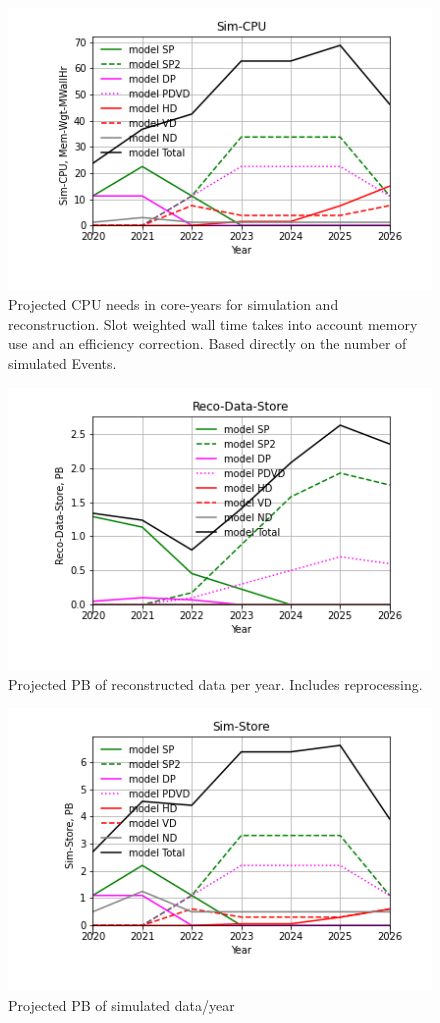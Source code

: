 \begin{figure}[h]
\centering\includegraphics[height=0.4\textwidth]{Parameters_2022-11-21-2026/Parameters_2022-11-21-2026-Sim-CPU.png}
\caption{Projected CPU needs in core-years for simulation and reconstruction.              Slot weighted wall time takes into account memory use and an efficiency correction. Based directly on the number of simulated Events.}
\label{fig:Sim-CPU}
\end{figure}
\begin{figure}[h]
\centering\includegraphics[height=0.4\textwidth]{Parameters_2022-11-21-2026/Parameters_2022-11-21-2026-Reco-Data-Store.png}
\caption{Projected PB of reconstructed data per year. Includes reprocessing.}
\label{fig:Reco-Data-Store}
\end{figure}
\begin{figure}[h]
\centering\includegraphics[height=0.4\textwidth]{Parameters_2022-11-21-2026/Parameters_2022-11-21-2026-Sim-Store.png}
\caption{Projected PB of simulated data/year}
\label{fig:Sim-Store}
\end{figure}
